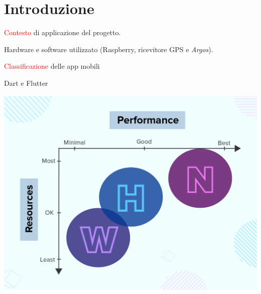 \documentclass[12pt,italian,oneside]{report}
\newcommand{\rosso}[1]{\textcolor{red}{#1}}
\begin{document}
\maketitle

\raggedright




\section{Introduzione}

\begin{firstheadlineitemize}

\item \rosso{Contesto} di applicazione del progetto.

\item Hardware e software utilizzato (Raspberry, ricevitore GPS e \textit{Argos}).

\item \rosso{Classificazione} delle app mobili

\item Dart e Flutter

\begin{center}
\includegraphics[scale=0.4]{native_hybrid_web}
\end{center}

\end{firstheadlineitemize}
\end{document}
